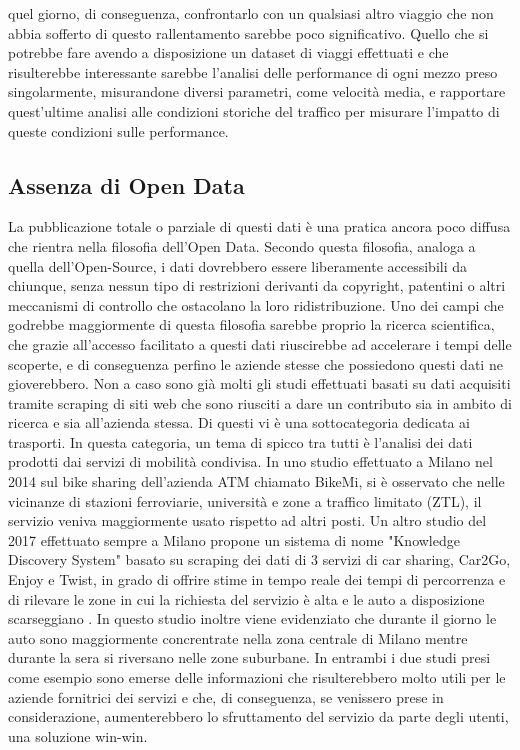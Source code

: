 quel giorno, di conseguenza, confrontarlo con un qualsiasi altro viaggio che non abbia sofferto di questo rallentamento sarebbe poco significativo. Quello che si potrebbe fare avendo a disposizione un dataset di viaggi effettuati e che risulterebbe interessante sarebbe l'analisi delle performance di ogni mezzo preso singolarmente, misurandone diversi parametri, come velocità media, e rapportare quest'ultime analisi alle condizioni storiche del traffico per misurare l'impatto di queste condizioni sulle performance.

\subsection{Assenza di Open Data}

La pubblicazione totale o parziale di questi dati è una pratica ancora poco diffusa che rientra nella filosofia dell'Open Data. Secondo questa filosofia, analoga a quella dell'Open-Source, i dati dovrebbero essere liberamente accessibili da chiunque, senza nessun tipo di restrizioni derivanti da copyright, patentini o altri meccanismi di controllo che ostacolano la loro ridistribuzione. Uno dei campi che godrebbe maggiormente di questa filosofia sarebbe proprio la ricerca scientifica, che grazie all'accesso facilitato a questi dati riuscirebbe ad accelerare i tempi delle scoperte, e di conseguenza perfino le aziende stesse che possiedono questi dati ne gioverebbero. Non a caso sono già molti gli studi effettuati basati su dati acquisiti tramite scraping di siti web che sono riusciti a dare un contributo sia in ambito di ricerca e sia all'azienda stessa. Di questi vi è una sottocategoria dedicata ai trasporti. In questa categoria, un tema di spicco tra tutti è l'analisi dei dati prodotti dai servizi di mobilità condivisa. In uno studio effettuato a Milano nel 2014 sul bike sharing dell'azienda ATM chiamato BikeMi, si è osservato che nelle vicinanze di stazioni ferroviarie, università e zone a traffico limitato (ZTL), il servizio veniva maggiormente usato rispetto ad altri posti\cite{croci2014}. Un altro studio del 2017 effettuato sempre a Milano propone un sistema di nome "Knowledge Discovery System" basato su scraping dei dati di 3 servizi di car sharing, Car2Go, Enjoy e Twist, in grado di offrire stime in tempo reale dei tempi di percorrenza e di rilevare le zone in cui la richiesta del servizio è alta e le auto a disposizione scarseggiano \cite{pagani2017}. In questo studio inoltre viene evidenziato che durante il giorno le auto sono maggiormente concrentrate nella zona centrale di Milano mentre durante la sera si riversano nelle zone suburbane. In entrambi i due studi presi come esempio sono emerse delle informazioni che risulterebbero molto utili per le aziende fornitrici dei servizi e che, di conseguenza, se venissero prese in considerazione, aumenterebbero lo sfruttamento del servizio da parte degli utenti, una soluzione win-win.

